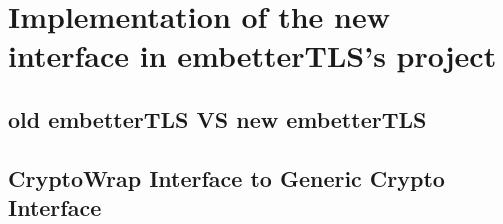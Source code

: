 \chapter{Implementation of the new interface in embetterTLS's project}

\section{old embetterTLS VS new embetterTLS}

\section{CryptoWrap Interface to Generic Crypto Interface}